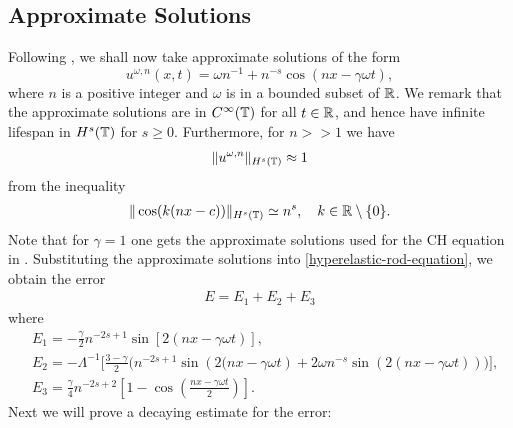 \subsection{Approximate Solutions}
%
Following \cite{Himonas:2010},
we shall now take approximate solutions of the form
%
%
\begin{equation}
\label{approx-solutions-form}
u^{\omega,n}(x,t) = \omega n^{-1} + n^{-s} \cos \left( nx - \gamma \omega t
\right), 
\end{equation}
where $n$ is a positive integer and $\omega$ is in a bounded subset of 
$\mathbb{R}$. We remark that the approximate 
solutions are in $C^\infty(\mathbb{T})$ for all $t \in \mathbb{R}$, and hence have 
infinite lifespan in $H^s(\mathbb{T})$ for $s  \ge 0$. Furthermore, for $n>>1$ we 
have 
%
%
\begin{equation}
\label{bound-approx}
\begin{split}
\|u^{\omega,n} \|_{H^s(\mathbb{T})} \approx 1	
\end{split}
\end{equation}
%
%
from the inequality
\begin{equation}
\label{1m}
\begin{split}
\|\cos(k(nx-c))\|_{H^s(\mathbb{T})} \simeq n^s, \quad k \in \mathbb{R} \setminus
\{0\}.
\end{split}
\end{equation}
%
%
%
%
Note that for $\gamma=1$ 
one gets the  approximate solutions
used for the CH equation in \cite{Himonas:2010}.
%
%
Substituting the approximate solutions into 
\eqref{hyperelastic-rod-equation}, we obtain the error
%
%
\begin{equation}
\begin{split}
E=
E_1 + E_2 + E_3 \label{57}
\end{split}
\end{equation}
%
%
where
\begin{align}
\label{90u}
& E_1 =
- \frac{\gamma}{2}n^{-2s+1}\sin\left[ 2\left( nx - \gamma \omega t \right)
\right],
\\
\label{90ah}
& E_2 = - \Lambda^{-1} \bigg[ \frac{3-\gamma}{2} \bigg (
n^{-2s+1} \sin\left( 2(nx - \gamma \omega t \right) + 2\omega n^{-s} \sin( 
2(nx - \gamma \omega t))
\bigg )
\bigg ],
\\
& E_3 = \frac{\gamma}{4}
n^{-2s+2} \left [ 1- \cos \left (\frac{nx - \gamma \omega t}{2} \right) 
\right ].
\label{90}
\end{align}
%
%
%
Next we will prove a decaying estimate for the error:
%
%
%
%
%                      
%
